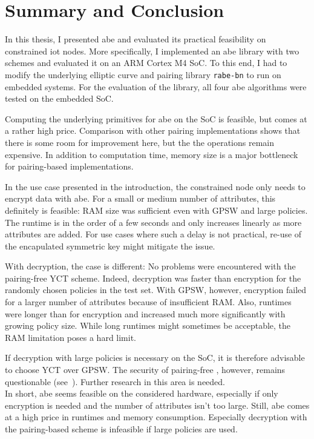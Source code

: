 \chapter{Summary and Conclusion}

In this thesis, I presented \acrshort{abe} and evaluated its practical feasibility on constrained \acrshort{iot} nodes.
More specifically, I implemented an \acrfull{abe} library with two schemes and evaluated it on an ARM Cortex M4 SoC.
To this end, I had to modify the underlying elliptic curve and pairing library \texttt{rabe-bn} to run on embedded systems.
For the evaluation of the library, all four \acrshort{abe} algorithms were tested on the embedded SoC.

Computing the underlying primitives for \acrshort{abe} on the SoC is feasible, but comes at a rather high price.
Comparison with other pairing implementations shows that there is some room for improvement here, but the the operations remain expensive.
In addition to computation time, memory size is a major bottleneck for pairing-based implementations.

In the use case presented in the introduction, the constrained node only needs to encrypt data with \acrshort{abe}.
For a small or medium number of attributes, this definitely is feasible:
RAM size was sufficient even with GPSW and large policies.
The runtime is in the order of a few seconds and only increases linearly as more attributes are added.
For use cases where such a delay is not practical, re-use of the encapulated symmetric key might mitigate the issue.

With decryption, the case is different: 
No problems were encountered with the pairing-free YCT scheme.
Indeed, decryption was faster than encryption for the randomly chosen policies in the test set.
With GPSW, however, encryption failed for a larger number of attributes because of insufficient RAM.
Also, runtimes were longer than for encryption and increased much more significantly with growing policy size.
While long runtimes might sometimes be acceptable, the RAM limitation poses a hard limit.

If decryption with large policies is necessary on the SoC, it is therefore advisable to choose YCT over GPSW.
The security of pairing-free , however, remains questionable (see~\cite{herranz_attacking_2020}).
Further research in this area is needed.\\

In short, \acrfull{abe} seems feasible on the considered hardware, especially if only encryption is needed and the number of attributes isn't too large.
Still, \acrshort{abe} comes at a high price in runtimes and memory consumption.
Especially decryption with the pairing-based scheme is infeasible if large policies are used.